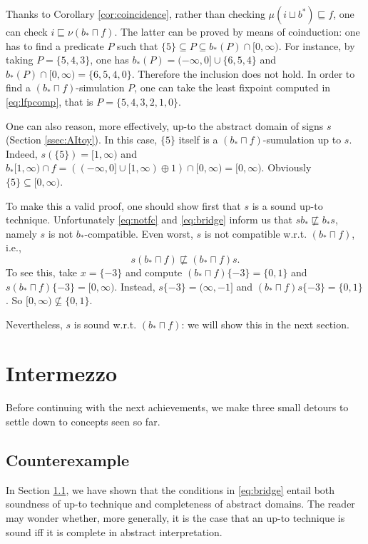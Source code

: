 \documentclass{llncs}
\begin{document}
Thanks to Corollary \ref{cor:coincidence}, rather than checking $\mu (i \sqcup b^*) \sqsubseteq f$, one can check $i \sqsubseteq \nu (b_* \sqcap f)$. The latter can be proved by means of coinduction: one has  to find a predicate $P$ such that $\{5\} \subseteq P \subseteq b_*(P) \cap [0,\infty)$. For instance, by taking $P = \{5,4,3\}$, one has $b_*(P) = (-\infty,0] \cup \{6,5,4\}$ and $b_*(P) \cap [0,\infty) = \{6,5,4,0\}$. Therefore the inclusion does not hold. In order to find a $(b_* \sqcap f)$-simulation $P$, one can take the least fixpoint computed in \eqref{eq:lfpcomp}, that is  $P= \{5,4,3,2,1,0\}$.

\medskip

One can also reason, more effectively, up-to the abstract domain of signs $s$ (Section \ref{ssec:AItoy}). In this case, $\{5\}$ itself is a $(b_* \sqcap f)$-sumulation up to $s$. Indeed, $s(\{5\}) = [1,\infty)$ and  $ b_*[1,\infty) \cap f = ( (-\infty, 0] \cup [1,\infty) \oplus \! 1)  \cap [0,\infty) = [0,\infty)$. Obviously $\{5\}\subseteq [0,\infty)$. 

To make this a valid proof, one should show first that $s$ is a sound up-to technique. Unfortunately \eqref{eq:notfc} and \eqref{eq:bridge} inform us that $sb_* \not \sqsubseteq b_* s$, namely $s$ is not $b_*$-compatible. Even worst, $s$ is not compatible w.r.t. $(b_*\sqcap f)$, i.e.,
$$
s(b_*\sqcap f) \not \sqsubseteq (b_*\sqcap f)s\text{.}
$$ 
To see this, take $x=\{-3\}$ and compute $(b_*\sqcap f)\{-3\}= \{0,1\}$ and $s(b_*\sqcap f)\{-3\}= [0,\infty)$.
Instead, $s\{-3\} = (\infty, -1]$ and $(b_*\sqcap f)s\{-3\} =  \{0,1\}$. So $[0,\infty) \not \subseteq \{0,1\}$.

Nevertheless, $s$ is sound w.r.t. $(b_*\sqcap f)$: we will show this in the next section.


\section{Intermezzo} 
%
Before continuing with the next achievements, we make three small detours to settle down to concepts seen so far.

\subsection{Counterexample}
In Section \ref{}, we have shown that the conditions in \eqref{eq:bridge} entail both soundness of up-to technique and completeness of abstract domains.
The reader may wonder whether, more generally, it is the case that an up-to technique is sound iff it is complete in abstract interpretation.
\end{document}
